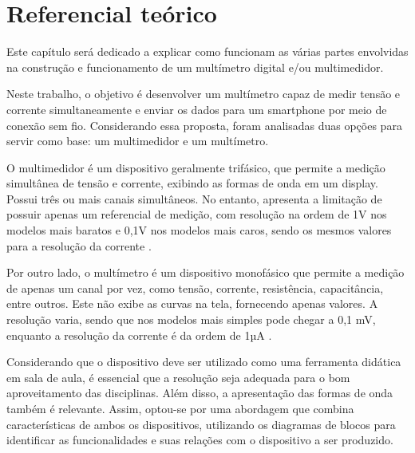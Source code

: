 \chapter{Referencial te\'orico}\label{cap:referencialTeorico}

Este capítulo será dedicado a explicar como funcionam as várias partes envolvidas na construção e funcionamento de um multímetro digital e/ou multimedidor.

Neste trabalho, o objetivo é desenvolver um multímetro capaz de medir tensão e corrente simultaneamente e enviar os dados para um smartphone por meio de conexão sem fio. Considerando essa proposta, foram analisadas duas opções para servir como base: um multimedidor e um multímetro.

O multimedidor é um dispositivo geralmente trifásico, que permite a medição simultânea de tensão e corrente, exibindo as formas de onda em um display. Possui três ou mais canais simultâneos. No entanto, apresenta a limitação de possuir apenas um referencial de medição, com resolução na ordem de 1V nos modelos mais baratos e 0,1V nos modelos mais caros, sendo os mesmos valores para a resolução da corrente \cite{fluke434}.

Por outro lado, o multímetro é um dispositivo monofásico que permite a medição de apenas um canal por vez, como tensão, corrente, resistência, capacitância, entre outros. Este não exibe as curvas na tela, fornecendo apenas valores. A resolução varia, sendo que nos modelos mais simples pode chegar a 0,1 mV, enquanto a resolução da corrente é da ordem de 1µA \cite{et1100}.

Considerando que o dispositivo deve ser utilizado como uma ferramenta didática em sala de aula, é essencial que a resolução seja adequada para o bom aproveitamento das disciplinas. Além disso, a apresentação das formas de onda também é relevante. Assim, optou-se por uma abordagem que combina características de ambos os dispositivos, utilizando os diagramas de blocos para identificar as funcionalidades e suas relações com o dispositivo a ser produzido.

